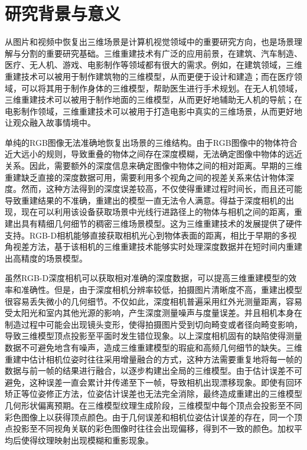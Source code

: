 \section{研究背景与意义}
从图片和视频中恢复出三维场景是计算机视觉领域中的重要研究方向，也是场景理解与分割的重要研究基础。三维重建技术有广泛的应用前景，在建筑、汽车制造、医疗、无人机、游戏、电影制作等领域都有很大的需求。例如，在建筑领域，三维重建技术可以被用于制作建筑物的三维模型，从而更便于设计和建造；而在医疗领域，可以将其用于制作身体的三维模型，帮助医生进行手术规划。在无人机领域，三维重建技术可以被用于制作地面的三维模型，从而更好地辅助无人机的导航；在电影制作领域，三维重建技术可以被用于打造电影中真实的三维场景，从而更好地让观众融入故事情境中。\par
单纯的RGB图像无法准确地恢复出场景的三维结构。由于RGB图像中的物体符合近大远小的规则，导致重叠的物体之间存在深度模糊，无法确定图像中物体的远近关系。因此，需要额外的深度信息来确定图像中物体之间的相对距离。早期的三维重建缺乏直接的深度数据可用，需要利用多个视角之间的视差关系来估计物体深度。然而，这种方法得到的深度误差较高，不仅使得重建过程时间长，而且还可能导致重建结果的不准确，重建出的模型一直无法令人满意。得益于深度相机的出现，现在可以利用该设备获取场景中光线行进路径上的物体与相机之间的距离，重建出具有精细几何细节的稠密三维场景模型。这为三维重建技术的发展提供了硬件支持。RGB-D相机能够直接获取相机光心到物体表面的距离，相比于早期的多视角视差方法，基于该相机的三维重建技术能够实时处理深度数据并在短时间内重建出高精度的场景模型。\par
虽然RGB-D深度相机可以获取相对准确的深度数据，可以提高三维重建模型的效率和准确性。但是，由于深度相机分辨率较低，拍摄图片清晰度不高，重建出模型很容易丢失微小的几何细节。不仅如此，深度相机普遍采用红外光测量距离，容易受太阳光和室内其他光源的影响，产生深度测量噪声与度量误差。并且相机本身在制造过程中可能会出现镜头变形，使得拍摄图片受到切向畸变或者径向畸变影响，导致三维模型顶点投影至平面时发生错位现象。以上深度相机固有的缺陷使得测量数据不可避免地含有噪声，造成三维重建模型的瑕疵和高频几何细节的缺失。三维重建中估计相机位姿时往往采用增量融合的方式，这种方法需要重复地将每一帧的数据与前一帧的结果进行融合，以逐步构建出全局的三维模型。由于估计误差不可避免，这种误差一直会累计并传递至下一帧，导致相机出现漂移现象。即使有回环矫正等位姿修正方法，位姿估计误差也无法完全消除，最终造成重建出的三维模型几何形状偏离预期。在三维模型纹理生成阶段，三维模型中每个顶点会投影至不同彩色图像上以获得顶点颜色。由于几何误差和相机位姿估计误差的存在，同一个顶点投影至不同视角关联的彩色图像时往往会出现偏移，得到不一致的颜色。加权平均后使得纹理映射出现模糊和重影现象。\par
